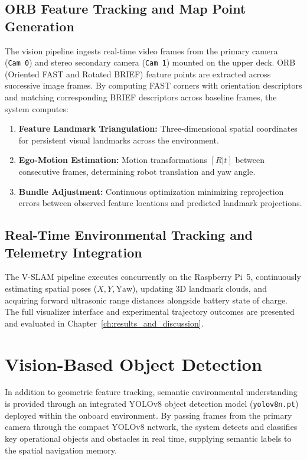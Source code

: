 \subsection{ORB Feature Tracking and Map Point Generation}
The vision pipeline ingests real-time video frames from the primary camera (\texttt{Cam~0}) and stereo secondary camera (\texttt{Cam~1}) mounted on the upper deck. ORB (Oriented FAST and Rotated BRIEF) feature points are extracted across successive image frames. By computing FAST corners with orientation descriptors and matching corresponding BRIEF descriptors across baseline frames, the system computes:
\begin{enumerate}
    \item \textbf{Feature Landmark Triangulation:} Three-dimensional spatial coordinates for persistent visual landmarks across the environment.
    \item \textbf{Ego-Motion Estimation:} Motion transformations $[R | t]$ between consecutive frames, determining robot translation and yaw angle.
    \item \textbf{Bundle Adjustment:} Continuous optimization minimizing reprojection errors between observed feature locations and predicted landmark projections.
\end{enumerate}

\subsection{Real-Time Environmental Tracking and Telemetry Integration}
The V-SLAM pipeline executes concurrently on the Raspberry Pi~5, continuously estimating spatial poses ($X, Y, \text{Yaw}$), updating 3D landmark clouds, and acquiring forward ultrasonic range distances alongside battery state of charge. The full visualizer interface and experimental trajectory outcomes are presented and evaluated in Chapter~\ref{ch:results_and_discussion}.

\section{Vision-Based Object Detection}
In addition to geometric feature tracking, semantic environmental understanding is provided through an integrated YOLOv8 object detection model (\texttt{yolov8n.pt}) deployed within the onboard environment. By passing frames from the primary camera through the compact YOLOv8 network, the system detects and classifies key operational objects and obstacles in real time, supplying semantic labels to the spatial navigation memory.

